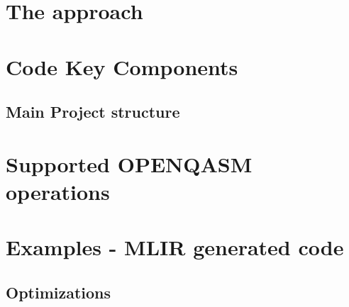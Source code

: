 \section{The approach}
\section{Code Key Components}
\subsection{Main Project structure}
\section{Supported OPENQASM operations}
\section{Examples - MLIR generated code}
\subsection{Optimizations}
